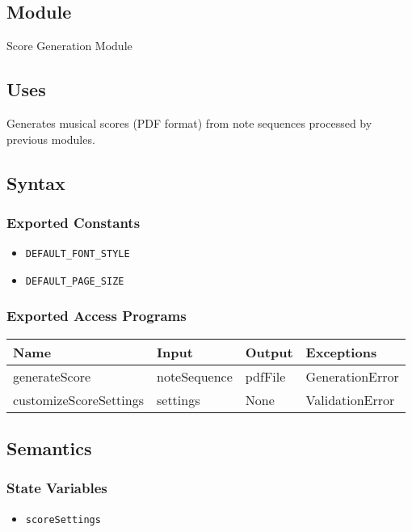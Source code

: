 \documentclass[12pt, titlepage]{article}
\begin{document}
\subsection{Module}  
Score Generation Module  

\subsection{Uses}  
Generates musical scores (PDF format) from note sequences processed by previous modules.  

\subsection{Syntax}  

\subsubsection{Exported Constants}  
\begin{itemize}
    \item \texttt{DEFAULT\_FONT\_STYLE}  
    \item \texttt{DEFAULT\_PAGE\_SIZE}  
\end{itemize}  

\subsubsection{Exported Access Programs}  
\begin{center}  
\begin{tabular}{|p{5cm}|p{4cm}|p{2cm}|p{3cm}|}  
\hline  
\textbf{Name} & \textbf{Input} & \textbf{Output} & \textbf{Exceptions} \\  
\hline  
generateScore & noteSequence & pdfFile & GenerationError \\  
customizeScoreSettings & settings & None & ValidationError \\  
\hline  
\end{tabular}  
\end{center}  

\subsection{Semantics}  

\subsubsection{State Variables}  
\begin{itemize}  
    \item \texttt{scoreSettings}  
\end{itemize}  
\end{document}
